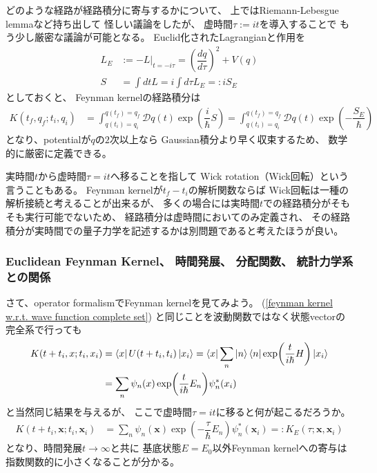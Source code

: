 どのような経路が経路積分に寄与するかについて、
上ではRiemann-Lebesgue lemmaなど持ち出して
怪しい議論をしたが、
虚時間$\tau := i t$を導入することで
もう少し厳密な議論が可能となる。
Euclid化されたLagrangianと作用を
\begin{subequations}
\begin{align}
    L_E
    &:=
    - L \Big|_{t = - i \tau}
    =
    \left(
        \dfrac{ d q }{ d \tau }
    \right)^2
    +
    V(q)
\\
    S
    &=
    \int dt L
    =
    i \int d\tau L_E
    =: i S_E
\end{align}
\end{subequations}
としておくと、
Feynman kernelの経路積分は
\begin{align}
    K( t_f, q_f ; t_i, q_i )
    &=
    \int_{q(t_i) = q_i}^{q(t_f) = q_f}
        \mathcal{D} q(t)
    \exp\left(
        \dfrac{i}{\hbar} S
    \right)
=
    \int_{q(t_i) = q_i}^{q(t_f) = q_f}
        \mathcal{D} q(t)
    \exp\left(
        -
        \dfrac{ S_E }{\hbar}
    \right)
\end{align}
となり、potentialが$q$の$2$次以上なら
Gaussian積分より早く収束するため、
数学的に厳密に定義できる。

実時間$t$から虚時間$\tau = i t$へ移ることを指して
Wick rotation（Wick回転）という言うこともある。
Feynman kernelが$t_f - t_i$の解析関数ならば
Wick回転は一種の解析接続と考えることが出来るが、
多くの場合には実時間$t$での経路積分がそもそも実行可能でないため、
経路積分は虚時間においてのみ定義され、
その経路積分が実時間での量子力学を記述するかは別問題であると考えたほうが良い。

\subsubsection{Euclidean Feynman Kernel、
    時間発展、
    分配関数、
    統計力学系との関係
}

さて、operator formalismでFeynman kernelを見てみよう。
(\ref{feynman kernel w.r.t. wave function complete set})
と同じことを波動関数ではなく状態vectorの完全系で行っても
\begin{align}
    K(t + t_i, x; t_i, x_i)
    &=
    \bra{ x }
        U (t + t_i, t_i)
    \ket{ x_i }
    =
    \bra{ x }
        \sum_n
            \ket{n}
            \bra{n}
        \exp(
            \dfrac{ t }{ i \hbar }
            H
        )
    \ket{ x_i }
\notag\\&
    =
    \sum_n
    \psi_n( x )
        \exp(
            \dfrac{ t }{ i \hbar }
            E_n
        )
    \psi_n^*( x_i )
\end{align}
と当然同じ結果を与えるが、
ここで虚時間$\tau = i t$に移ると何が起こるだろうか。
\begin{align}
    K(t + t_i, \bm{x}; t_i, \bm{x}_i)
    &=
    \sum_n
    \psi_n( \bm{x} )
        \exp(
            -
            \dfrac{ \tau }{ \hbar }
            E_n
        )
    \psi_n^*( \bm{x}_i )
    =:
    K_E ( \tau; \bm{x}, \bm{x}_i )
\end{align}
となり、時間発展$t \to \infty$と共に
基底状態$ E = E_0 $以外Feynman kernelへの寄与は
指数関数的に小さくなることが分かる。

